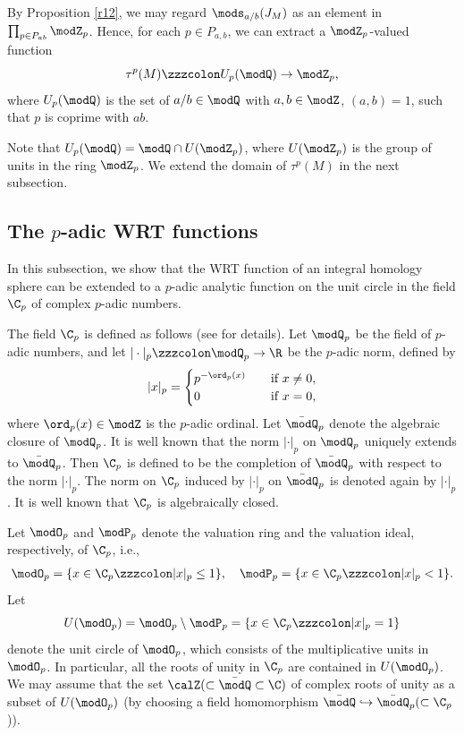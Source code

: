 \documentclass{amsart}
\numberwithin{equation}{section}
\numberwithin{figure}{section}
\theoremstyle{plain}
\theoremstyle{definition}
\theoremstyle{remark}
\begin{document}
By Proposition \ref{r12}, we may regard $\mods _{a/b}(J_M)$ as an element
in $\prod_{p\in P_{ab}}\modZ _p$.  Hence, for each $p\in P_{a,b}$, we can
extract a $\modZ _p$-valued function
\begin{equation}
  \label{e60}
  \tau ^p(M)\zzzcolon U_p(\modQ )\rightarrow \modZ _p,
\end{equation}
where $U_p(\modQ )$ is the set of $a/b\in \modQ $ with $a,b\in \modZ $, $(a,b)=1$,
such that $p$ is coprime with $ab$.

Note that $U_p(\modQ )=\modQ \cap U(\modZ _p)$, where $U(\modZ _p)$ is the group of units
in the ring $\modZ _p$.  We extend the domain of $\tau ^p(M)$ in the next
subsection.

\subsection{The $p$-adic WRT functions}
\label{sec:p-adic-wrt}

In this subsection, we show that the WRT
function of an integral homology sphere can be extended to a $p$-adic
analytic function on the unit circle in the field $\C_p$ of complex
$p$-adic numbers.

The field $\C_p$ is defined as follows (see \cite{Koblitz,Gouvea} for
details).  Let $\modQ _p$ be the field of $p$-adic numbers, and let
$|\cdot|_p\zzzcolon \modQ _p\rightarrow \R$ be the $p$-adic norm, defined by
\begin{equation*}
  |x|_p=\begin{cases}
  p^{-\ord_p(x)} \quad &\text{if $x\neq0$},\\
  0 &\text{if $x=0$},
  \end{cases}
\end{equation*}
where $\ord_p(x)\in \modZ $ is the $p$-adic ordinal.  Let $\bar\modQ _p$ denote
the algebraic closure of $\modQ _p$.  It is well known that the norm
$|\cdot|_p$ on $\modQ _p$ uniquely extends to $\bar\modQ _p$.  Then $\C_p$ is
defined to be the completion of $\bar\modQ _p$ with respect to the norm
$|\cdot|_p$.  The norm on $\C_p$ induced by $|\cdot|_p$ on $\bar\modQ _p$
is denoted again by $|\cdot|_p$.  It is well known that $\C_p$ is
algebraically closed.

Let $\modO _p$ and $\modP _p$ denote the valuation ring and the valuation
ideal, respectively, of $\C_p$, i.e.,
\begin{gather*}
  \modO _p=\{x\in \C_p\zzzcolon |x|_p\le 1\},\quad \modP _p=\{x\in \C_p\zzzcolon |x|_p<1\}.
\end{gather*}
Let
\begin{equation*}
  U(\modO _p)=\modO _p\setminus \modP _p=\{x\in \C_p\zzzcolon |x|_p=1\}
\end{equation*}
denote the unit circle of $\modO _p$, which consists of the multiplicative
units in $\modO _p$.  In particular, all the roots of unity in $\C_p$ are
contained in $U(\modO _p)$.  We may assume that the set
$\calZ(\subset \bar\modQ \subset \C)$ of complex roots of unity as a subset of
$U(\modO _p)$ (by choosing a field homomorphism
$\bar\modQ \hookrightarrow\bar\modQ _p(\subset \C_p$)).
\end{document}

